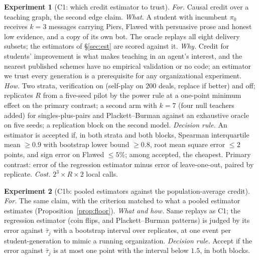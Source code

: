 \documentclass[11pt]{article}
\numberwithin{theorem}{section}
\theoremstyle{definition}
\theoremstyle{problemstyle}
\newtheorem{experiment}{Experiment}[section]
\begin{document}
\begin{experiment}[C1: which credit estimator to trust]
\emph{For.} Causal credit over a teaching graph, the second edge claim.
\emph{What.} A student with incumbent $\pi_0$ receives $k=3$ messages carrying Piers, Flawed with persuasive prose and
honest low evidence, and a copy of its own bot. The oracle replays all eight delivery subsets; the estimators of
\S\ref{sec:est} are scored against it.
\emph{Why.} Credit for students' improvement is what makes teaching in an agent's interest, and the nearest published
schemes have no empirical validation or no code; an estimator we trust every generation is a prerequisite for any
organizational experiment.
\emph{How.} Two strata, verification on (self-play on $200$ deals, replace if better) and off; replicates $R$ from a
five-seed pilot by the power rule at a one-point minimum effect on the primary contrast; a second arm with $k=7$ (four
null teachers added) for singles-plus-pairs and Plackett--Burman against an exhaustive oracle on five seeds; a
replication block on the second model.
\emph{Decision rule.} An estimator is accepted if, in both strata and both blocks, Spearman interquartile mean $\ge0.9$
with bootstrap lower bound $\ge0.8$, root mean square error $\le2$ points, and sign error on Flawed $\le5\%$; among
accepted, the cheapest. Primary contrast: error of the regression estimator minus error of leave-one-out, paired by
replicate.
\emph{Cost.} $2^3\times R\times2$ local calls.
\end{experiment}

\begin{experiment}[C1b: pooled estimators against the population-average credit]
\emph{For.} The same claim, with the criterion matched to what a pooled estimator estimates
(Proposition~\ref{prop:floor}).
\emph{What and how.} Same replays as C1; the regression estimator (coin flips, and Plackett--Burman patterns) is
judged by its error against $\bar\tau_j$ with a bootstrap interval over replicates, at one event per student-generation
to mimic a running organization.
\emph{Decision rule.} Accept if the error against $\bar\tau_j$ is at most one point with the interval below $1.5$, in
both blocks.
\end{experiment}
\end{document}
